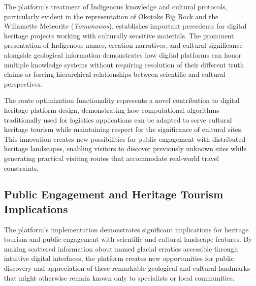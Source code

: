 The platform's treatment of Indigenous knowledge and cultural protocols, particularly evident in the representation of Okotoks Big Rock and the Willamette Meteorite (\emph{Tomanowos}), establishes important precedents for digital heritage projects working with culturally sensitive materials. The prominent presentation of Indigenous names, creation narratives, and cultural significance alongside geological information demonstrates how digital platforms can honor multiple knowledge systems without requiring resolution of their different truth claims or forcing hierarchical relationships between scientific and cultural perspectives.


The route optimization functionality represents a novel contribution to digital heritage platform design, demonstrating how computational algorithms traditionally used for logistics applications can be adapted to serve cultural heritage tourism while maintaining respect for the significance of cultural sites. This innovation creates new possibilities for public engagement with distributed heritage landscapes, enabling visitors to discover previously unknown sites while generating practical visiting routes that accommodate real-world travel constraints.

\subsection{Public Engagement and Heritage Tourism Implications}
\label{subsec:public_engagement_implications}

The platform's implementation demonstrates significant implications for heritage tourism and public engagement with scientific and cultural landscape features. By making scattered information about named glacial erratics accessible through intuitive digital interfaces, the platform creates new opportunities for public discovery and appreciation of these remarkable geological and cultural landmarks that might otherwise remain known only to specialists or local communities.

